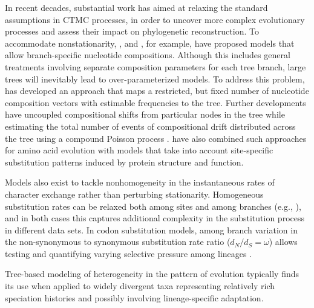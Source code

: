 In recent decades, substantial work has aimed at relaxing the standard assumptions in CTMC processes, in order to uncover more complex evolutionary processes and assess their impact on phylogenetic reconstruction. 
To accommodate nonstationarity, \citet{Yang1995}, \citet{Galtier1998} and \citet{Galtier1999}, for example, have proposed models that allow branch-specific nucleotide compositions.
Although this includes general treatments involving separate composition parameters for each tree branch, large trees will inevitably lead to over-parameterized models.
To address this problem, \citet{Foster2004} has developed an approach that maps a restricted, but fixed number of nucleotide composition vectors with estimable frequencies to the tree. 
Further developments have uncoupled compositional shifts from particular nodes in the tree while estimating the total number of events of compositional drift distributed across the tree using a compound Poisson process \citep{Blanquart2006}. 
\cite{Blanquart2008} have also combined such approaches for amino acid evolution with models that take into account site-specific substitution patterns induced by protein structure and function.

Models also exist to tackle nonhomogeneity in the instantaneous rates of character exchange rather than perturbing stationarity.
Homogeneous substitution rates can be relaxed both among sites \citep{Huelsenbeck1999} and among branches (e.g., \citet{Foster12082009}), and in both cases this captures additional complexity in the substitution process in different data sets. 
In codon substitution models, among branch variation in the non-synonymous to synonymous substitution rate ratio ($d_N/d_S = \omega$) allows testing and quantifying varying selective pressure among lineages \citep{Yang1998}.

\par  %

Tree-based modeling of heterogeneity in the pattern of evolution typically finds its use when applied to widely divergent taxa representing relatively rich speciation histories and possibly involving lineage-specific adaptation.

